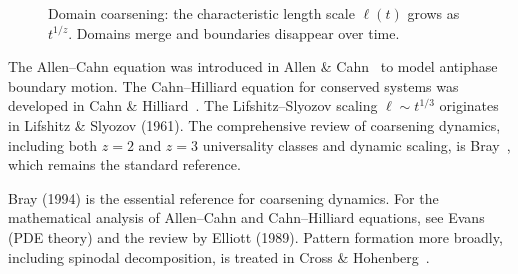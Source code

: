 \begin{figure}[ht]
\centering
{}
\caption{Domain coarsening: the characteristic length scale $\ell(t)$
         grows as $t^{1/z}$.
         Domains merge and boundaries disappear over time.}
\label{fig:coarsening}
\end{figure}

\begin{CitationAnchor}
  The Allen--Cahn equation was introduced in Allen \& Cahn~\cite{allen1979}
  to model antiphase boundary motion.
  The Cahn--Hilliard equation for conserved systems was developed
  in Cahn \& Hilliard~\cite{cahn1958}.
  The Lifshitz--Slyozov scaling $\ell \sim t^{1/3}$ originates in
  Lifshitz \& Slyozov (1961).
  The comprehensive review of coarsening dynamics, including both
  $z=2$ and $z=3$ universality classes and dynamic scaling, is
  Bray~\cite{bray1994}, which remains the standard reference.
\end{CitationAnchor}

\begin{FurtherReading}
  Bray (1994) is the essential reference for coarsening dynamics.
  For the mathematical analysis of Allen--Cahn and Cahn--Hilliard
  equations, see Evans~\cite{evans2010} (PDE theory) and
  the review by Elliott (1989).
  Pattern formation more broadly, including spinodal decomposition,
  is treated in Cross \& Hohenberg~\cite{cross1993}.
\end{FurtherReading}
